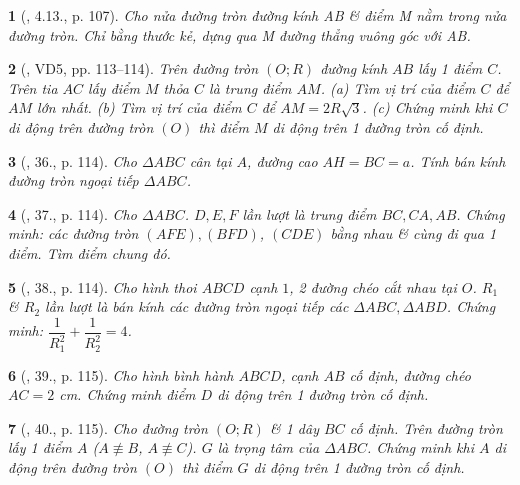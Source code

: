 \documentclass{article}
\newtheorem{baitoan}{}
\begin{document}
\begin{baitoan}[\cite{Binh_boi_duong_Toan_9_tap_1}, 4.13., p. 107]
	Cho nửa đường tròn đường kính AB \& điểm M nằm trong nửa đường tròn. Chỉ bằng thước kẻ, dựng qua M đường thẳng vuông góc với AB.
\end{baitoan}

\begin{baitoan}[\cite{Tuyen_Toan_9_old}, VD5, pp. 113--114]
	Trên đường tròn $(O;R)$ đường kính $AB$ lấy 1 điểm $C$. Trên tia $AC$ lấy điểm $M$ thỏa $C$ là trung điểm $AM$. (a) Tìm vị trí của điểm $C$ để $AM$ lớn nhất. (b) Tìm vị trí của điểm $C$ để $AM = 2R\sqrt{3}$. (c) Chứng minh khi $C$ di động trên đường tròn $(O)$ thì điểm $M$ di động trên 1 đường tròn cố định.
\end{baitoan}

\begin{baitoan}[\cite{Tuyen_Toan_9_old}, 36., p. 114]
	Cho $\Delta ABC$ cân tại $A$, đường cao $AH = BC = a$. Tính bán kính đường tròn ngoại tiếp $\Delta ABC$.
\end{baitoan}

\begin{baitoan}[\cite{Tuyen_Toan_9_old}, 37., p. 114]
	Cho $\Delta ABC$. $D,E,F$ lần lượt là trung điểm $BC,CA,AB$. Chứng minh: các đường tròn $(AFE),(BFD)$, $(CDE)$ bằng nhau \& cùng đi qua 1 điểm. Tìm điểm chung đó.
\end{baitoan}

\begin{baitoan}[\cite{Tuyen_Toan_9_old}, 38., p. 114]
	Cho hình thoi $ABCD$ cạnh $1$, 2 đường chéo cắt nhau tại $O$. $R_1$ \& $R_2$ lần lượt là bán kính các đường tròn ngoại tiếp các $\Delta ABC,\Delta ABD$. Chứng minh: $\dfrac{1}{R_1^2} + \dfrac{1}{R_2^2} = 4$.
\end{baitoan}

\begin{baitoan}[\cite{Tuyen_Toan_9_old}, 39., p. 115]
	Cho hình bình hành $ABCD$, cạnh $AB$ cố định, đường chéo $AC = 2$ \emph{cm}. Chứng minh điểm $D$ di động trên 1 đường tròn cố định.
\end{baitoan}

\begin{baitoan}[\cite{Tuyen_Toan_9_old}, 40., p. 115]
	Cho đường tròn $(O;R)$ \& 1 dây $BC$ cố định. Trên đường tròn lấy 1 điểm $A$ ($A\not\equiv B$, $A\not\equiv C$). $G$ là trọng tâm của $\Delta ABC$. Chứng minh khi $A$ di động trên đường tròn $(O)$ thì điểm $G$ di động trên 1 đường tròn cố định.
\end{baitoan}
\end{document}

